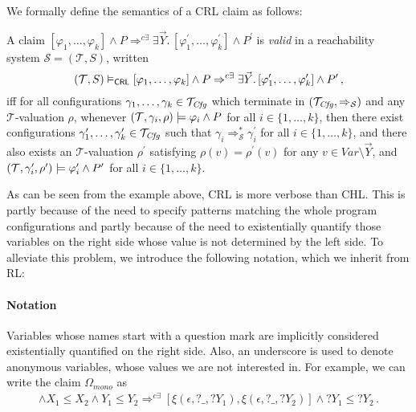 We formally define the semantics of a CRL claim as follows:
\begin{definition}\label{def:opCRLsemantics}
    A claim
     $[\varphi_1,\ldots,\varphi_k] \land P
     \Rightarrow^{c\exists} \exists \vec{Y}.\, [\varphi^\prime_1,\ldots,\varphi^\prime_k] \land P^\prime$
    is \emph{valid} in a reachability system $\mathcal{S} = (\mathcal{T}, S)$,
    written
    \begin{equation*}
        (\mathcal{T}, S) \vDash_{\mathsf{CRL}} [\varphi_1,\ldots,\varphi_k] \land P
     \Rightarrow^{c\exists} \exists \vec{Y}.\, [\varphi^\prime_1,\ldots,\varphi^\prime_k] \land P^\prime \, ,
    \end{equation*}
    iff for all configurations $\gamma_1,\ldots,\gamma_k \in \mathcal{T}_{\mathit{Cfg}}$
    which terminate in $(\mathcal{T}_{\mathit{Cfg}}, \Rightarrow_{\mathcal{S}})$
    and any $\mathcal{T}$-valuation $\rho$,
    whenever $(\mathcal{T}, \gamma_i,\rho) \models \varphi_i \land P$ for all $i \in \{ 1, \ldots, k \}$,
    then there exist configurations $\gamma_1^\prime,\ldots,\gamma_k^\prime \in \mathcal{T}_{\mathit{Cfg}}$
    such that $\gamma_i \Rightarrow^{*}_{\mathcal{S}} \gamma_i^\prime$ for all $i \in \{ 1, \ldots, k \}$,
    and there also exists an $\mathcal{T}$-valuation $\rho^\prime$
    satisfying $\rho(v) = \rho^\prime(v)$ for any $v \in \mathit{Var} \setminus \vec{Y}$,
    and
    $(\mathcal{T}, \gamma_i^\prime,\rho^\prime) \models \varphi^\prime_i \land P^\prime$ for all $i \in \{ 1, \ldots, k \}$.
\end{definition}


As can be seen from the example above, CRL is more verbose than CHL. This is
partly because of the need to specify patterns matching the whole program
configurations and partly because of the need to existentially quantify those
variables on the right side whose value is not determined by the left side. To
alleviate this problem, we introduce the following notation, which we inherit
from RL:

\paragraph{Notation}
Variables whose names start with a question mark are implicitly considered
existentially quantified on the right side.  Also, an underscore is used to
denote anonymous variables, whose values we are not interested in.  For
example, we can write the claim $\Omega_{\textit{mono}}$ as
\begin{align*}
[\xi(P, X_1, Y_1),\xi(P, X_2, Y_2)] \land X_1 \leq X_2 \land Y_1 \leq Y_2
 \Rightarrow^{c\exists} [\xi(\epsilon, ?\_, ?Y_1), \xi(\epsilon, ?\_, ?Y_2)] \land ?Y_1 \leq ?Y_2 \, .
\end{align*}

